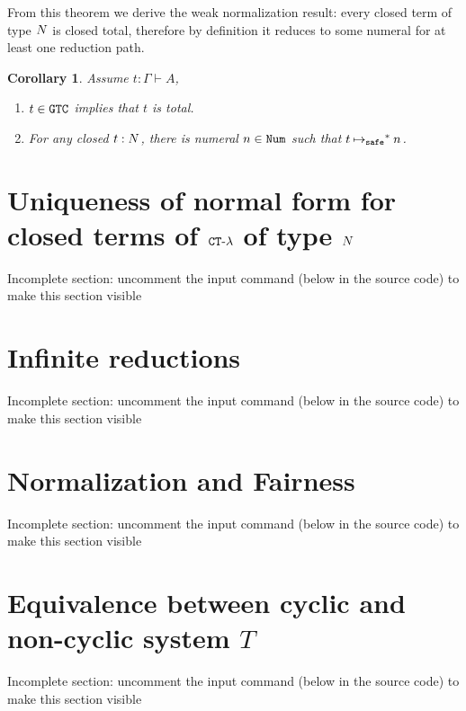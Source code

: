 \documentclass{article}
\newtheorem{corollary}[theorem]{Corollary}
\begin{document}
From this theorem we derive the weak normalization result: 
every closed term of type ${N}$ is closed total, therefore by definition it reduces to some numeral for at least
one reduction path. 

\begin{corollary}
Assume  $t: \Gamma\vdash A$,
\begin {enumerate}
\item
 $t \in {\tt GTC}$ implies that $t$ is total.
\item
  For any closed $t:{N}$, there is numeral $n\in{\tt Num}$ such that $t\mathbin{{\mapsto}_{\tiny \tt safe}}^* n$. 
\end{enumerate}
\end{corollary}




\section{Uniqueness of normal form for closed terms of ${ {\tt CT} \mbox{-} \lambda}$ of type ${N}$}
\label{section-uniqueness-normal-form}
{Incomplete section: uncomment the input command (below in the source code) to make this section visible}



\section{Infinite reductions}
\label{section-infinite-reductions}
{Incomplete section: uncomment the input command (below in the source code) to make this section visible}




\section{Normalization and Fairness}
\label{section-normalization-fairness}
{Incomplete section: uncomment the input command (below in the source code) to make this section visible}



\section{Equivalence between cyclic and non-cyclic system $T$} 
\label{section-equivalence-cyclic-non-cyclic-T}
{Incomplete section: uncomment the input command (below in the source code) to make this section visible}

\end{document}
